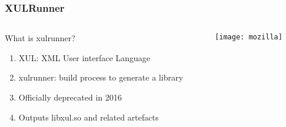 \documentclass[
	notes=none,
	aspectratio=169
]{beamer}
\begin{document}

\begin{frame}
\frametitle{}

\begin{columns}[T]
\begin{column}[T]{1.048\textwidth}
\setlength{\parskip}{1.048em}

\vspace{0.5cm}





\end{column}
\end{columns}

\end{frame}
\note{
\begin{enumerate}
\item -
\end{enumerate}
}


\begin{frame}
\frametitle{XULRunner}

\begin{columns}[T]
\begin{column}[T]{0.5\textwidth}
\setlength{\parskip}{0.5em}

\vspace{1.5cm}
What is xulrunner?
\begin{enumerate}
\setlength{\parskip}{0.5em}
\item XUL: XML User interface Language
\item xulrunner: build process to generate a library
\item Officially deprecated in 2016
\item Outputs libxul.so and related artefacts
\end{enumerate}

\end{column}
\begin{column}[T]{0.5\textwidth}
\setlength{\parskip}{0.5em}

\vspace{0.5cm}
\texttt{[image: mozilla]}

\end{column}
\end{columns}

\end{frame}
\note{
\begin{enumerate}
\item -
\end{enumerate}
}
\end{document}
